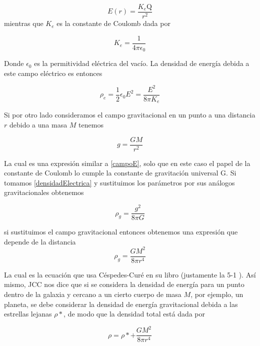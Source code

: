 \begin{equation} \label{campoE}
    E(r)=\frac{K_e \mathrm{Q}}{r^2}
\end{equation}
mientras que $K_e$ es la constante de Coulomb dada por 

\begin{equation}
    K_e= \dfrac{1}{4\pi \epsilon_0}
\end{equation}

Donde $\epsilon_0 $ es la permitividad eléctrica del vacío. La densidad de energía debida a este campo eléctrico es entonces

\begin{equation} \label{densidadElectrica}
    \rho_e = \frac{1}{2}\epsilon_0 E^2 = \frac{E^2}{8\pi K_e}
\end{equation}

Si por otro lado consideramos el campo gravitacional en un punto a una distancia $r$ debido a una masa $M$ tenemos

\begin{equation}
    g = \frac{GM}{r^2}
\end{equation}

La cual es una expresión similar a \eqref{campoE}, solo que en este caso el papel de la constante de Coulomb lo cumple la constante de gravitación universal G. Si tomamos \eqref{densidadElectrica} y sustituimos los parámetros por sus análogos gravitacionales obtenemos

\begin{equation} \label{densidad}
    \rho_g = \frac{g^2}{8 \pi G}
\end{equation}

si sustituimos el campo gravitacional entonces obtenemos una expresión que depende de la distancia
\begin{equation}
    \rho_g = \frac{GM^2}{8 \pi r^4}
\end{equation}

La cual es la ecuación que usa Céspedes-Curé en su libro (justamente la 5-1 \cite{bib:el-libro}). Así mismo, JCC nos dice que si se considera la densidad de energía para un punto dentro de la galaxia y cercano a un cierto cuerpo de masa $M$, por ejemplo, un planeta, se debe considerar la densidad de energía gravitacional debida a las estrellas lejanas $\rho*$, de modo que la densidad total está dada por

\begin{equation}
    \rho = \rho* + \frac{GM^2}{8 \pi r^4}
\end{equation}


